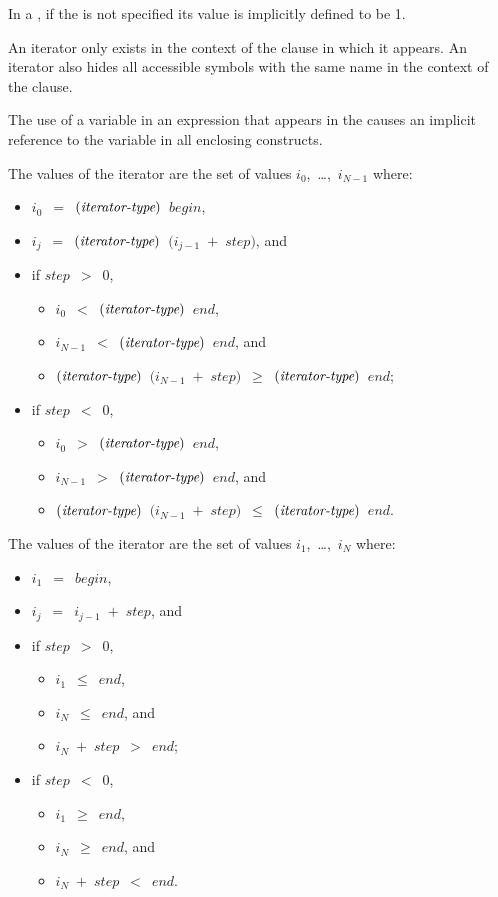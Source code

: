 In a , if the  is not specified its value is
implicitly defined to be 1.

An iterator only exists in the context of the clause in which it appears. An
iterator also hides all accessible symbols with the same name in the context of
the clause.

The use of a variable in an expression that appears in the
 causes an implicit reference to the variable in all
enclosing constructs.

\begin{ccppspecific}
The values of the iterator are the set of values $i_{0}$,~\ldots,~$i_{N-1}$ where:
\begin{itemize}
\item $i_{0}$~$=$~$(\plc{iterator-type})$~$begin$, 
\item $i_{j}$~$=$~$(\plc{iterator-type})$~$(i_{j-1}$~$+$~$step)$, and
\item  if $step$~$>$~$0$,
\begin{itemize}
\item $i_{0}$~$<$~$(\plc{iterator-type})$~$end$,
\item $i_{N-1}$~$<$~$(\plc{iterator-type})$~$end$, and 
\item $(\plc{iterator-type})$~$(i_{N-1}$~$+$~$step)$~$\geq$~$(\plc{iterator-type})$~$end$;
\end{itemize}
\item if $step$~$<$~$0$,
\begin{itemize}
\item $i_{0}$~$>$~$(\plc{iterator-type})$~$end$,
\item $i_{N-1}$~$>$~$(\plc{iterator-type})$~$end$, and 
\item $(\plc{iterator-type})$~$(i_{N-1}$~$+$~$step)$~$\leq$~$(\plc{iterator-type})$~$end$.
\end{itemize}
\end{itemize}
\end{ccppspecific}

\begin{fortranspecific}
The values of the iterator are the set of values $i_{1}$,~\ldots,~$i_{N}$ where:
\begin{itemize}
\item $i_{1}$~$=$~$begin$,  
\item $i_{j}$~$=$~$i_{j-1}$~$+$~$step$, and
\item if $step$~$>$~$0$,
\begin{itemize}
\item $i_{1}$~$\leq$~$end$,
\item $i_{N}$~$\leq$~$end$, and 
\item $i_{N}$~$+$~$step$~$>$~$end$;
\end{itemize}
\item if $step$~$<$~$0$,
\begin{itemize}
\item $i_{1}$~$\geq$~$end$,
\item $i_{N}$~$\geq$~$end$, and 
\item $i_{N}$~$+$~$step$~$<$~$end$.
\end{itemize}
\end{itemize}
\end{fortranspecific}

